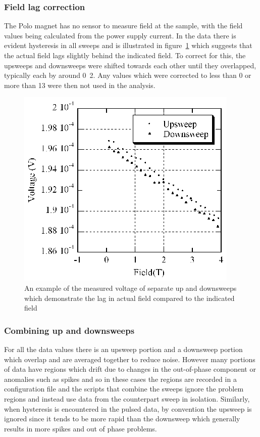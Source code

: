 \subsubsection{Field lag correction}

The Polo magnet has no sensor to measure field at the sample, with the field values being calculated from the power supply current. In the data there is evident hysteresis in all sweeps and is illustrated in figure~\ref{Fig:Exp:PoloHysteresis} which suggests that the actual field lags slightly behind the indicated field. To correct for this, the upsweeps and downsweeps were shifted towards each other until they overlapped, typically each by around \unit{0.2}{\tesla}. Any values which were corrected to less than \unit{0}{\tesla} or more than \unit{13}{\tesla} were then not used in the analysis.
\begin{figure}[htbp]
    \begin{center}
        \includegraphics[scale=1.1]{Chapter-ExperimentalTechnique/Figures/PoloHysteresis/PoloHysteresis}
        \caption{An example of the measured voltage of separate up and downsweeps which demonstrate the lag in actual field compared to the indicated field}
        \label{Fig:Exp:PoloHysteresis}
    \end{center}
\end{figure}

\subsubsection{Combining up and downsweeps}

For all the data values there is an upsweep portion and a downsweep portion which overlap and are averaged together to reduce noise. However many portions of data have regions which drift due to changes in the out-of-phase component or anomalies such as spikes and so in these cases the regions are recorded in a configuration file and the scripts that combine the sweeps ignore the problem regions and instead use data from the counterpart sweep in isolation. Similarly, when hysteresis is encountered in the pulsed data, by convention the upsweep is ignored since it tends to be more rapid than the downsweep which generally results in more spikes and out of phase problems.

